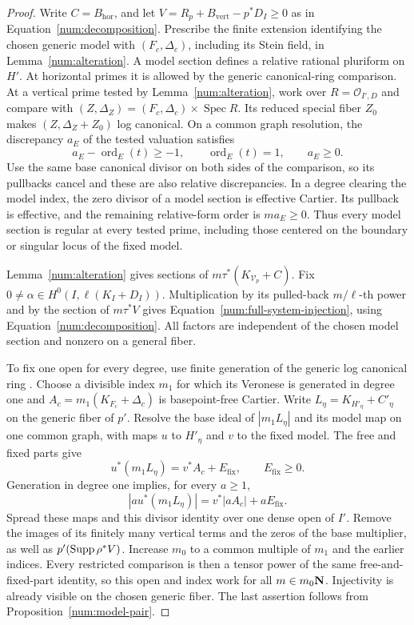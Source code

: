 \begin{proof}
Write $C=B_{\mathrm{hor}}$, and let
$V=R_p+B_{\mathrm{vert}}-p^*D_I\geq0$ as in
Equation~\eqref{num:decomposition}. Prescribe the finite extension
identifying the chosen generic model
with $(F_c,\Delta_c)$, including its Stein field, in
Lemma~\ref{num:alteration}. A model section defines a relative rational
pluriform on $H'$. At horizontal primes it is allowed by the generic
canonical-ring comparison. At a vertical prime tested by
Lemma~\ref{num:alteration}, work over $R=\mathcal O_{I',D}$ and compare
with $(Z,\Delta_Z)=(F_c,\Delta_c)\times\operatorname{Spec}R$.
Its reduced special fiber $Z_0$ makes $(Z,\Delta_Z+Z_0)$ log canonical.
On a common graph resolution, the discrepancy $a_E$ of the tested
valuation satisfies
\[
 a_E-\operatorname{ord}_E(t)\geq-1,
 \qquad \operatorname{ord}_E(t)=1,
 \qquad a_E\geq0.
\]
Use the same base canonical divisor on both sides of the comparison,
so its pullbacks cancel and these are also relative discrepancies.
In a degree clearing the model index, the zero divisor of a model
section is effective Cartier. Its pullback is effective, and the
remaining relative-form order is $ma_E\geq0$. Thus every model section
is regular at every tested prime, including those centered on the
boundary or singular locus of the fixed model.

Lemma~\ref{num:alteration} gives sections of
$m\tau^*(K_{\mathcal V_p}+C)$. Fix
$0\ne\alpha\in H^0(I,\ell(K_I+D_I))$. Multiplication by its
pulled-back $m/\ell$-th power and by the section of $m\tau^*V$ gives
Equation~\eqref{num:full-system-injection}, using
Equation~\eqref{num:decomposition}. All factors are independent of
the chosen model section and nonzero on a general fiber.

To fix one open for every degree, use finite generation of the generic
log canonical ring \cite{BCHM}. Choose a divisible index $m_1$ for
which its Veronese is generated in degree one and
$A_c=m_1(K_{F_c}+\Delta_c)$ is basepoint-free Cartier. Write
$L_\eta=K_{H'_\eta}+C'_\eta$ on the generic fiber of $p'$.
Resolve the base ideal of $|m_1L_\eta|$ and its model map on one
common graph, with maps $u$ to $H'_\eta$ and $v$ to the fixed model.
The free and fixed parts give
\[
 u^*(m_1L_\eta)=v^*A_c+E_{\mathrm{fix}},
 \qquad E_{\mathrm{fix}}\geq0.
\]
Generation in degree one implies, for every $a\geq1$,
\[
 |a u^*(m_1L_\eta)|=v^*|aA_c|+aE_{\mathrm{fix}}.
\]
Spread these maps and this divisor identity over one dense open of
$I'$. Remove the images of its finitely many vertical terms and the
zeros of the base multiplier, as well as $p'(\operatorname{Supp}\rho^*V)$.
Increase $m_0$ to a common multiple of
$m_1$ and the earlier indices. Every restricted comparison is then a
tensor power of the same free-and-fixed-part identity, so this open
and index work for all $m\in m_0\mathbf N$. Injectivity is already visible
on the chosen generic fiber. The last assertion follows from
Proposition~\ref{num:model-pair}.
\end{proof}

